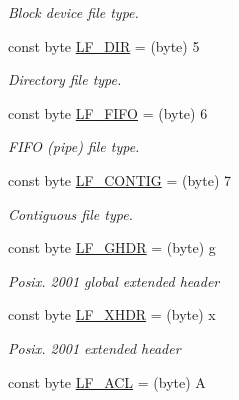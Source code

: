 \begin{DoxyCompactItemize}
\begin{DoxyCompactList}\small\item\em Block device file type. \end{DoxyCompactList}\item 
const byte \hyperlink{class_i_c_sharp_code_1_1_sharp_zip_lib_1_1_tar_1_1_tar_header_ae29c412c5f6365dbc8b5b3868f007971}{L\+F\+\_\+\+D\+IR} = (byte) \textquotesingle{}5\textquotesingle{}
\begin{DoxyCompactList}\small\item\em Directory file type. \end{DoxyCompactList}\item 
const byte \hyperlink{class_i_c_sharp_code_1_1_sharp_zip_lib_1_1_tar_1_1_tar_header_adc4c0d184bb7c45ab75370c046052f7f}{L\+F\+\_\+\+F\+I\+FO} = (byte) \textquotesingle{}6\textquotesingle{}
\begin{DoxyCompactList}\small\item\em F\+I\+FO (pipe) file type. \end{DoxyCompactList}\item 
const byte \hyperlink{class_i_c_sharp_code_1_1_sharp_zip_lib_1_1_tar_1_1_tar_header_a512b72493de49b58ffaa33497b2a5412}{L\+F\+\_\+\+C\+O\+N\+T\+IG} = (byte) \textquotesingle{}7\textquotesingle{}
\begin{DoxyCompactList}\small\item\em Contiguous file type. \end{DoxyCompactList}\item 
const byte \hyperlink{class_i_c_sharp_code_1_1_sharp_zip_lib_1_1_tar_1_1_tar_header_a15fc2be3b638e0a39dbc3b14ba5e0494}{L\+F\+\_\+\+G\+H\+DR} = (byte) \textquotesingle{}g\textquotesingle{}
\begin{DoxyCompactList}\small\item\em Posix. 2001 global extended header \end{DoxyCompactList}\item 
const byte \hyperlink{class_i_c_sharp_code_1_1_sharp_zip_lib_1_1_tar_1_1_tar_header_a33edcec3e184f2b37ae597f3a2e0563c}{L\+F\+\_\+\+X\+H\+DR} = (byte) \textquotesingle{}x\textquotesingle{}
\begin{DoxyCompactList}\small\item\em Posix. 2001 extended header \end{DoxyCompactList}\item 
const byte \hyperlink{class_i_c_sharp_code_1_1_sharp_zip_lib_1_1_tar_1_1_tar_header_aa7cb529baae768d4687f0b2d9431ea12}{L\+F\+\_\+\+A\+CL} = (byte) \textquotesingle{}A\textquotesingle{}

\end{DoxyCompactItemize}
